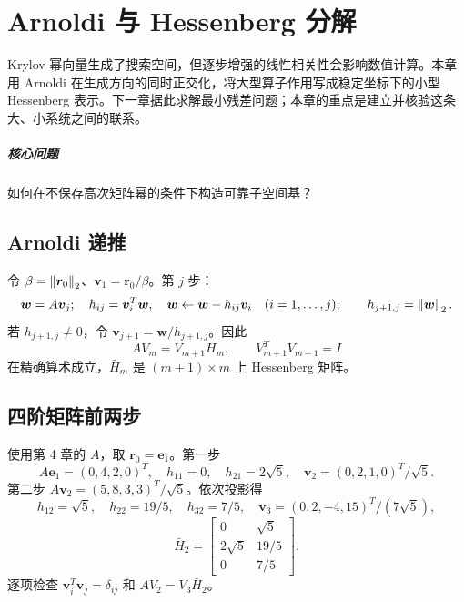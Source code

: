 \chapter{Arnoldi 与 Hessenberg 分解}\label{v0ch:11}
\begin{chaptersummary}
Krylov 幂向量生成了搜索空间，但逐步增强的线性相关性会影响数值计算。本章用 Arnoldi 在生成方向的同时正交化，将大型算子作用写成稳定坐标下的小型 Hessenberg 表示。下一章据此求解最小残差问题；本章的重点是建立并核验这条大、小系统之间的联系。
\end{chaptersummary}
\paragraph{核心问题}如何在不保存高次矩阵幂的条件下构造可靠子空间基？

\section{Arnoldi 递推}
令 $\beta=\left\lVert \bm r_0\right\rVert_2$、$\bm v_1=\bm r_0/\beta$。第 $j$ 步：
\[
 \bm w=A\bm v_j;\quad
 h_{ij}=\bm v_i^T\bm w,\quad
 \bm w\leftarrow\bm w-h_{ij}\bm v_i\quad(i=1,\ldots,j);
 \qquad h_{j+1,j}=\left\lVert \bm w\right\rVert_2.
\]
若 $h_{j+1,j}\ne0$，令 $\bm v_{j+1}=\bm w/h_{j+1,j}$。因此
\[
 AV_m=V_{m+1}\bar H_m,\qquad V_{m+1}^TV_{m+1}=I
\]
在精确算术成立，$\bar H_m$ 是 $(m+1)\times m$ 上 Hessenberg 矩阵。
\section{四阶矩阵前两步}
使用第 4 章的 $A$，取 $\bm r_0=\bm e_1$。第一步
\[
 A\bm e_1=(0,4,2,0)^T,\quad h_{11}=0,\quad
 h_{21}=2\sqrt5,\quad
 \bm v_2=(0,2,1,0)^T/\sqrt5.
\]
第二步 $A\bm v_2=(5,8,3,3)^T/\sqrt5$。依次投影得
\[
 h_{12}=\sqrt5,\quad h_{22}=19/5,\quad
 h_{32}=7/5,\quad
 \bm v_3=(0,2,-4,15)^T/(7\sqrt5),
\]
\[
 \bar H_2=\begin{bmatrix}0&\sqrt5\\2\sqrt5&19/5\\0&7/5\end{bmatrix}.
\]
逐项检查 $\bm v_i^T\bm v_j=\delta_{ij}$ 和 $AV_2=V_3\bar H_2$。
